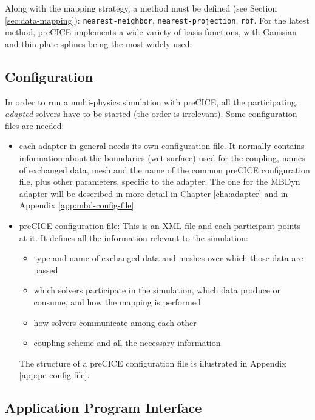 Along with the mapping strategy, a method must be defined (see Section \ref{sec:data-mapping}): \texttt{nearest-neighbor}, \texttt{nearest-projection}, \texttt{rbf}. For the latest method, preCICE implements a wide variety of basis functions, with Gaussian and thin plate splines being the most widely used.

 

\subsection{Configuration}
\label{sec:pc-config}

In order to run a multi-physics simulation with preCICE, all the participating, \textit{adapted} solvers have to be started (the order is irrelevant).
Some configuration files are needed:

\begin{itemize}
	\item each adapter in general needs its own configuration file. It normally contains information about the boundaries (wet-surface) used for the coupling, names of exchanged data, mesh and the name of the common preCICE configuration file, plus other parameters, specific to the adapter. The one for the MBDyn adapter will be described in more detail in Chapter \ref{cha:adapter} and in Appendix \ref{app:mbd-config-file}.
	\item preCICE configuration file: This is an XML file and each participant points at it. It defines all the information relevant to the simulation:
	\begin{itemize}
		\item type and name of exchanged data and meshes over which those data are passed
		\item which solvers participate in the simulation, which data produce or consume, and how the mapping is performed
		\item how solvers communicate among each other
		\item coupling scheme and all the necessary information 
	\end{itemize}
	
	The structure of a preCICE configuration file is illustrated in Appendix \ref{app:pc-config-file}.
		
\end{itemize}


\subsection{Application Program Interface}
\label{sec:pc-api}

